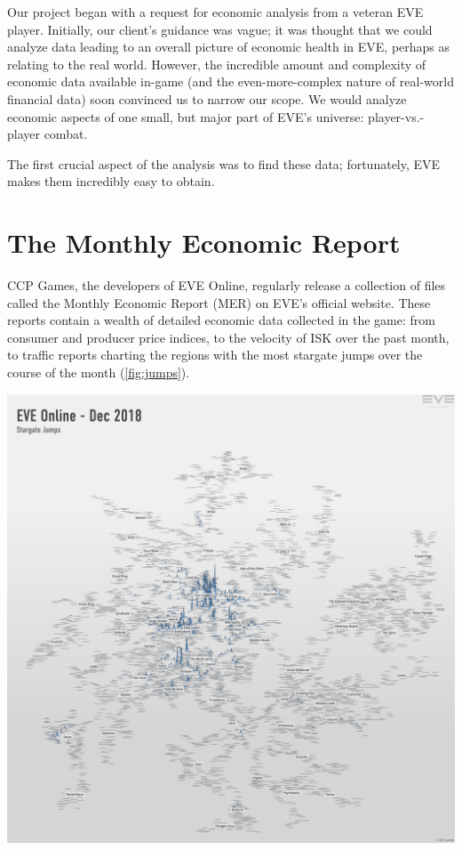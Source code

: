 \documentclass[letterpaper,12pt,article]{memoir}
\begin{document}
Our project began with a request for economic analysis from a veteran EVE
player. Initially, our client's guidance was vague; it was thought that we could
analyze data leading to an overall picture of economic health in EVE, perhaps as
relating to the real world. However, the incredible amount and complexity of
economic data available in-game (and the even-more-complex nature of real-world
financial data) soon convinced us to narrow our scope. We would analyze 
economic aspects of one small, but major part of EVE's universe:
player-vs.-player combat.

The first crucial aspect of the analysis was to find these data; fortunately,
EVE makes them incredibly easy to obtain.

\section{The Monthly Economic Report}

CCP Games, the developers of EVE Online, regularly release a collection of files
called the Monthly Economic Report (MER) on EVE's official website.
\cite{MERdec2018}
These reports contain a wealth of detailed economic data collected in the game: 
from consumer and producer price indices, to the velocity of ISK over the past 
month, to traffic reports charting the regions with the most stargate jumps over
the course of the month (\cref{fig:jumps}).

\begin{myfigure}[blanker]
    \centering
    \captionsetup{type=figure}
    \includegraphics[height=\myspace]{stargate_jumps.png}
    \label{fig:jumps}
\end{myfigure}
\end{document}
